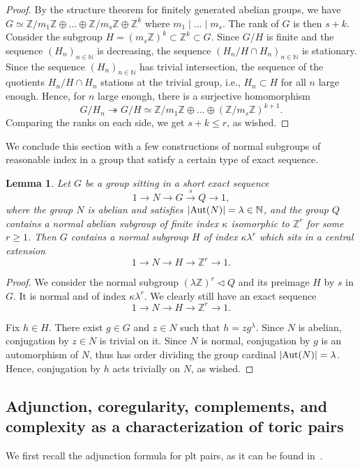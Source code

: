\documentclass{amsart}
\newcommand{\zz}{\mathbb{Z}}
\newcommand{\nn}{\mathbb{N}}
\newtheorem{lemma}[theorem]{Lemma}
\theoremstyle{definition}
\theoremstyle{remark}
\numberwithin{equation}{section}
\begin{document}
\begin{proof}
By the structure theorem for finitely generated abelian groups, we have $G\simeq \zz/{m_1}\zz \oplus \dots \oplus \zz/{m_s}\zz \oplus \zz^k $ where $m_1\mid \dots \mid m_s$. The rank of $G$ is then $s+k$.
Consider the subgroup 
$H = (m_{s}\zz)^k\subset \zz^k\subset G$.
Since $G/H$ is finite and the sequence $(H_n)_{n\in\nn}$ is decreasing, the sequence $(H_n/H\cap H_n)_{n\in\nn}$ is stationary. Since the sequence $(H_n)_{n\in\nn}$ has trivial intersection, the sequence of the quotients $H_n/H\cap H_n$ stations at the trivial group, i.e., $H_n \subset H$ for all $n$ large enough.
Hence, for $n$ large enough, there is a surjective homomorphism
$$G/H_n \twoheadrightarrow G/H\simeq \zz/{m_1}\zz \oplus \dots \oplus (\zz/{m_{s}}\zz)^{k+1}.$$
Comparing the ranks on each side, we get $s+k\le r$, as wished.
\end{proof}

We conclude this section with a few constructions of normal subgroups of reasonable index in a group that satisfy a certain type of exact sequence.

\begin{lemma}\label{lem:exact-seq}
 Let $G$ be a group sitting in a short exact sequence
    $$1\to N\to G\overset{s}{\longrightarrow} Q\to 1,$$
where the group $N$ is abelian and satisfies $|{\rm Aut}(N)| = \lambda\in \nn$, and the group $Q$ contains a normal abelian subgroup of finite index $\kappa$ isomorphic to $\mathbb{Z}^r$ for some $r\ge 1$. Then $G$ contains a normal subgroup $H$ of index $\kappa\lambda^r$ which sits in a central extension
$$1\to N\to H\to \zz^r\to 1.$$
\end{lemma}

\begin{proof}
    We consider the normal subgroup $(\lambda\zz)^r\triangleleft Q$ and its preimage $H$ by $s$ in $G$. It is normal and of index $\kappa\lambda^r$. We clearly still have an exact sequence
    $$1\to N\to H\to \zz^r\to 1.$$
    
    Fix $h\in H$. There exist $g\in G$ and $z\in N$ such that $h = zg^{\lambda}$. Since $N$ is abelian, conjugation by $z\in N$ is trivial on it. Since $N$ is normal, conjugation by $g$ is an automorphism of $N$, thus has order dividing the group cardinal $|{\rm Aut}(N)|=\lambda$. Hence, conjugation by $h$ acts trivially on $N$, as wished.
\end{proof}

\subsection{Adjunction, coregularity, complements, and complexity as a characterization of toric pairs}\label{subsec:ft-cy}
We first recall the adjunction formula for plt pairs, as it can be found in~\cite[Proposition 3.9]{Sho92}.
\end{document}
